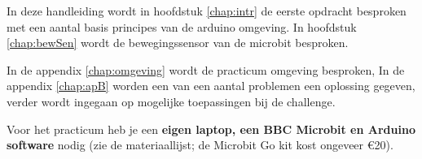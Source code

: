 In deze handleiding wordt in hoofdstuk \ref{chap:intr} de eerste opdracht besproken met een aantal basis principes van de arduino omgeving. In hoofdstuk \ref{chap:bewSen} wordt de bewegingssensor van de microbit besproken. 

In de appendix \ref{chap:omgeving}  wordt de practicum omgeving besproken, In de appendix \ref{chap:apB} worden een van een aantal problemen een oplossing gegeven, verder wordt ingegaan op mogelijke toepassingen bij de challenge.

Voor het practicum heb je een \textbf{eigen laptop, een BBC Microbit en Arduino software} nodig 
(zie de materiaallijst; de Microbit Go kit kost ongeveer \euro{}20). 